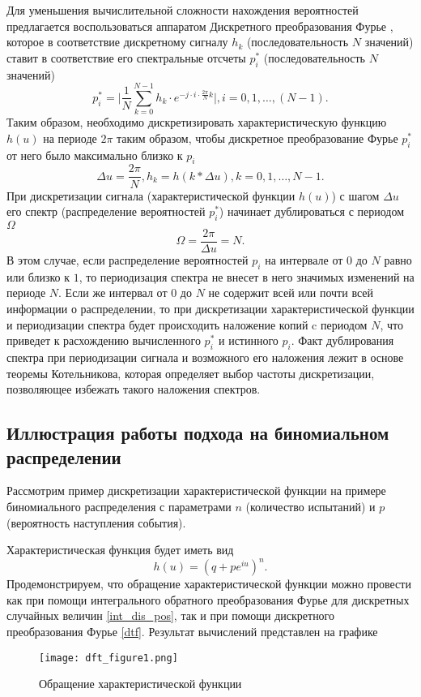Для уменьшения вычислительной сложности нахождения вероятностей предлагается воспользоваться аппаратом Дискретного преобразования Фурье \cite{тимошенко2014дискретное}, которое в соответствие дискретному сигналу $h_k$ (последовательность $N$ значений) ставит в соответствие его спектральные отсчеты $p^*_i$ (последовательность $N$ значений)
\begin{equation} \label{dtf}
	p^*_i = \bigg | \frac{1}{N}\sum_{k=0}^{N-1}h_k\cdot e^{-j\cdot i \cdot \frac{2\pi}{N}k} \bigg |,i = 0,1,\dots,(N-1).
\end{equation}
Таким образом, необходимо дискретизировать характеристическую функцию $h(u)$ на периоде $2\pi$ таким образом, чтобы дискретное преобразование Фурье $p^*_i$ от него было максимально близко к $p_i$
\begin{equation}
	\Delta u = \frac{2\pi}{N},h_k = h(k*\Delta u),k = 0,1,\dots,N-1.
\end{equation}
При дискретизации сигнала (характеристической функции $h(u)$) с шагом $\Delta u$ его спектр (распределение вероятностей $p^*_i$) начинает дублироваться с периодом $\Omega$
\begin{equation}
	\Omega = \frac{2\pi}{\Delta u} = N.
\end{equation}
В этом случае, если распределение вероятностей $p_i$ на интервале от $0$ до $N$ равно или близко к $1$, то периодизация спектра не внесет в него значимых изменений на периоде $N$. Если же интервал от $0$ до $N$ не содержит всей или почти всей информации о распределении, то при дискретизации характеристической функции и периодизации спектра будет происходить наложение копий c периодом $N$, что приведет к расхождению вычисленного $p^*_i$ и истинного $p_i$. Факт дублирования спектра при периодизации сигнала и возможного его наложения лежит в основе теоремы Котельникова, которая определяет выбор частоты дискретизации, позволяющее избежать такого наложения спектров.

\subsection{Иллюстрация работы подхода на биномиальном распределении}
Рассмотрим пример дискретизации характеристической функции на примере биномиального распределения с параметрами $n$ (количество испытаний) и $p$ (вероятность наступления события).

Характеристическая функция будет иметь вид
\begin{equation}
	h(u) = (q+pe^{iu})^n.
\end{equation}
Продемонстрируем, что обращение характеристической функции можно провести как при помощи интегрального обратного преобразования Фурье для дискретных случайных величин \eqref{int_dis_pos}, так и при помощи дискретного преобразования Фурье \eqref{dtf}. Результат вычислений представлен на графике
\begin{figure}[H]
	\centering
	\texttt{[image: dft\_figure1.png]}
	\caption{Обращение характеристической функции} \label{dft_figure1}
\end{figure}

